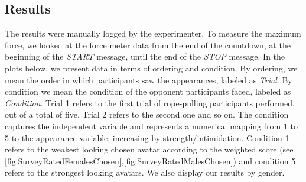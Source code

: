 \subsection{Results}
The results were manually logged by the experimenter. To measure the maximum force, we looked at the force meter data from the end of the countdown, at the beginning of the \textit{START} message, until the end of the \textit{STOP} message. In the plots below, we present data in terms of ordering and condition. By ordering, we mean the order in which participants saw the appearances, labeled as \textit{Trial}. By condition we mean the condition of the opponent participants faced, labeled as \textit{Condition}. Trial 1 refers to the first trial of rope-pulling participants performed, out of a total of five. Trial 2 refers to the second one and so on. The condition captures the independent variable and represents a numerical mapping from 1 to 5 to the appearance variable, increasing by strength/intimidation. Condition 1 refers to the weakest looking chosen avatar according to the weighted score (see \ref{fig:SurveyRatedFemalesChosen},\ref{fig:SurveyRatedMalesChosen}) and condition 5 refers to the strongest looking avatars. We also display our results by gender.

